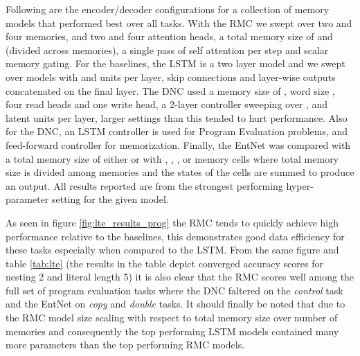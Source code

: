 \documentclass{article}
\begin{document}
Following are the encoder/decoder configurations for a collection of memory models that performed best over all tasks. With the RMC we swept over two and four memories, and two and four attention heads, a total memory size of  and  (divided across memories), a single pass of self attention per step and scalar memory gating.  For the baselines, the LSTM is a two layer model and we swept over models with  and  units per layer, skip connections and layer-wise outputs concatenated on the final layer.  The DNC used a memory size of , word size , four read heads and one write head, a 2-layer controller sweeping over ,  and  latent units per layer, larger settings than this tended to hurt performance.  Also for the DNC, an LSTM controller is used for Program Evaluation problems, and feed-forward controller for memorization.  Finally, the EntNet was compared with a total memory size of either  or  with , , , or  memory cells where total memory size is divided among memories and the states of the cells are summed to produce an output.  All results reported are from the strongest performing hyper-parameter setting for the given model. 

As seen in figure \ref{fig:lte_results_prog} the RMC tends to quickly achieve high performance relative to the baselines, this demonstrates good data efficiency for these tasks especially when compared to the LSTM.  From the same figure and table \ref{tab:lte} (the results in the table depict converged accuracy scores for nesting 2 and literal length 5) it is also clear that the RMC scores well among the full set of program evaluation tasks where the DNC faltered on the \textit{control} task and the EntNet on \textit{copy} and \textit{double} tasks.  It should finally be noted that due to the RMC model size scaling with respect to total memory size over number of memories and consequently the top performing LSTM models contained many more parameters than the top performing RMC models.
\end{document}
